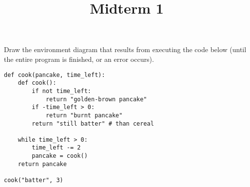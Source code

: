 \documentclass[twoside]{article}
\title{\sc Midterm 1}
\begin{document}
\thispagestyle{empty}
\maketitle

\begin{enumerate}

Draw the environment diagram that results from executing the code below (until the entire program is finished, or an error occurs).
\vspace{0.1in}

\begin{lstlisting}
def cook(pancake, time_left):
    def cook():
        if not time_left:
            return "golden-brown pancake"
        if -time_left > 0:
            return "burnt pancake"
        return "still batter" # than cereal

    while time_left > 0:
        time_left -= 2
        pancake = cook()
    return pancake

cook("batter", 3)
\end{lstlisting}

\end{enumerate}
\end{document}
